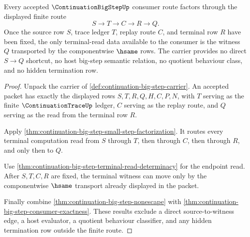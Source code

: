 \begin{theorem}
\label{thm:continuation-big-step-terminal-route-exhaustion}
Every accepted $\ContinuationBigStepUp$ consumer route factors through the displayed finite route
$$
S \longrightarrow T \longrightarrow C \longrightarrow R \longrightarrow Q.
$$
Once the source row $S$, trace ledger $T$, replay route $C$, and terminal row $R$ have been fixed, the only terminal-read data available to the consumer is the witness $Q$ transported by the componentwise $\hsame$ rows. The carrier provides no direct $S \to Q$ shortcut, no host big-step semantic relation, no quotient behaviour class, and no hidden termination row.
\end{theorem}
\begin{proof}
Unpack the carrier of \autoref{def:continuation-big-step-carrier}. An accepted packet has exactly the displayed rows $S,T,R,Q,H,C,P,N$, with $T$ serving as the finite $\ContinuationTraceUp$ ledger, $C$ serving as the replay route, and $Q$ serving as the read from the terminal row $R$.

Apply \autoref{thm:continuation-big-step-small-step-factorization}. It routes every terminal computation read from $S$ through $T$, then through $C$, then through $R$, and only then to $Q$.

Use \autoref{thm:continuation-big-step-terminal-read-determinacy} for the endpoint read. After $S,T,C,R$ are fixed, the terminal witness can move only by the componentwise $\hsame$ transport already displayed in the packet.

Finally combine \autoref{thm:continuation-big-step-nonescape} with \autoref{thm:continuation-big-step-consumer-exactness}. These results exclude a direct source-to-witness edge, a host evaluator, a quotient behaviour classifier, and any hidden termination row outside the finite route.
\end{proof}

